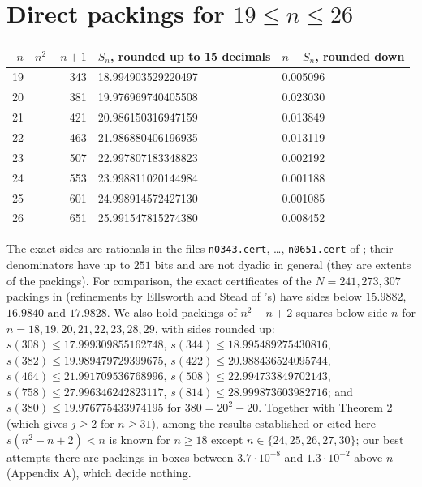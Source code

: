 \documentclass[11pt,letterpaper]{amsart}
\theoremstyle{plain}
\begin{document}
\section{Direct packings for \texorpdfstring{$19 \le n \le 26$}{19 <= n <= 26}}

\begin{center}
\begin{tabular}{rrll}
\toprule
$n$ & $n^2 - n + 1$ & $S_n$, rounded up to 15 decimals & $n - S_n$, rounded down \\
\midrule
19 & 343 & 18.994903529220497 & 0.005096 \\
20 & 381 & 19.976969740405508 & 0.023030 \\
21 & 421 & 20.986150316947159 & 0.013849 \\
22 & 463 & 21.986880406196935 & 0.013119 \\
23 & 507 & 22.997807183348823 & 0.002192 \\
24 & 553 & 23.998811020144984 & 0.001188 \\
25 & 601 & 24.998914572427130 & 0.001085 \\
26 & 651 & 25.991547815274380 & 0.008452 \\
\bottomrule
\end{tabular}
\end{center}

The exact sides are rationals in the files \texttt{n0343.cert}, \ldots, \texttt{n0651.cert} of \cite{Fan26}; their denominators have up to $251$ bits and are not dyadic in general (they are extents of the packings). For comparison, the exact certificates of the $N = 241, 273, 307$ packings in \cite{Dan26} (refinements by Ellsworth and Stead of \cite{AMS21}'s) have sides below $15.9882$, $16.9840$ and $17.9828$. We also hold packings of $n^2 - n + 2$ squares below side $n$ for $n = 18, 19, 20, 21, 22, 23, 28, 29$, with sides rounded up: $s(308) \le 17.999309855162748$, $s(344) \le 18.995489275430816$, $s(382) \le 19.989479729399675$, $s(422) \le 20.988436524095744$, $s(464) \le 21.991709536768996$, $s(508) \le 22.994733849702143$, $s(758) \le 27.996346242823117$, $s(814) \le 28.999873603982716$; and $s(380) \le 19.976775433974195$ for $380 = 20^2 - 20$. Together with Theorem 2 (which gives $j \ge 2$ for $n \ge 31$), among the results established or cited here $s(n^2 - n + 2) < n$ is known for $n \ge 18$ except $n \in \{24, 25, 26, 27, 30\}$; our best attempts there are packings in boxes between $3.7 \cdot 10^{-8}$ and $1.3 \cdot 10^{-2}$ above $n$ (Appendix A), which decide nothing.
\end{document}
